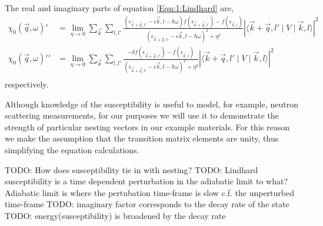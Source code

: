 The real and imaginary parts of equation \ref{Eqn:1:Lindhard} are,
\begin{align}
\chi_0(\vec{q}, \omega)\prime &= \lim_{\eta \to 0} \sum_{\vec{k}}\sum_{l, l\prime}\frac{(\epsilon_{\vec{k}+\vec{q},l\prime} - \epsilon{\vec{k},l} - \hbar\omega) f(\epsilon_{\vec{k}+\vec{q},l\prime}) - f(\epsilon_{\vec{k},l})}{(\epsilon_{\vec{k}+\vec{q},l\prime} - \epsilon{\vec{k},l} - \hbar\omega)^2 + \eta^2}|\langle \vec{k}+\vec{q},l\prime \mid  V \mid \vec{k},l \rangle|^2 \\
\chi_0(\vec{q}, \omega)\prime\prime &= \lim_{\eta \to 0} \sum_{\vec{k}}\sum_{l, l\prime}\frac{-\delta f(\epsilon_{\vec{k}+\vec{q},l\prime}) - f(\epsilon_{\vec{k},l})}{(\epsilon_{\vec{k}+\vec{q},l\prime} - \epsilon{\vec{k},l} - \hbar\omega)^2 + \eta^2}|\langle \vec{k}+\vec{q},l\prime \mid  V \mid \vec{k},l \rangle|^2 \\
\end{align}
respectively.

Although knowledge of the susceptibility is useful to model, for example, neutron scattering measurements, for our purposes we will use it to demonstrate the strength of particular nesting vectors in our example materials. For this reason we make the assumption that the transition matrix elements are unity, thus simplifying the equation calculations.


TODO: How does susceptibility tie in with nesting?
TODO: Lindhard susceptibility is a time dependent perturbation in the adiabatic limit to what? Adiabatic limit is where the pertubation time-frame is slow c.f. the unperturbed time-frame 
TODO: imaginary factor corresponds to the decay rate of the state
TODO: energy(susceptibility) is broadened by the decay rate





